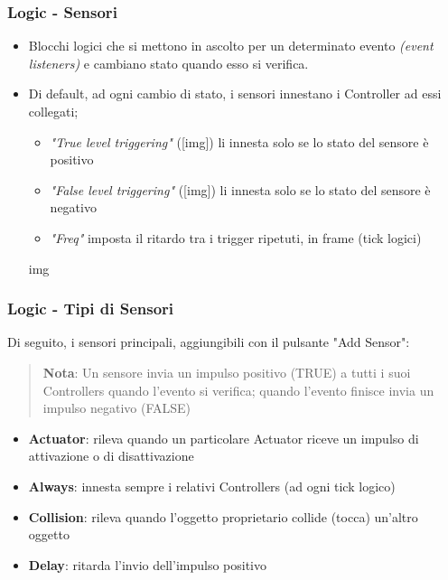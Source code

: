 \documentclass{beamer}
\begin{document}
		\begin{frame}		%
			\frametitle{Logic - Sensori}
			\begin{itemize}
				\item Blocchi logici che si mettono in ascolto per un determinato evento \textit{(event listeners)} e cambiano stato quando esso si verifica.
				\item Di default, ad ogni cambio di stato, i sensori innestano i Controller ad essi collegati;
				\begin{itemize}
					\item \textit{"True level triggering"} ([img]) li innesta solo se lo stato del sensore è positivo
					\item \textit{"False level triggering"} ([img]) li innesta solo se lo stato del sensore è negativo
					\item \textit{"Freq"} imposta il ritardo tra i trigger ripetuti, in frame (tick logici)
				\end{itemize}
				\item [img]
			\end{itemize}
		\end{frame}		
		\begin{frame}
			\frametitle{Logic - Tipi di Sensori}
			Di seguito, i sensori principali, aggiungibili con il pulsante "Add Sensor":\\
			\begin{quote}
			\textbf{Nota}: Un sensore invia un impulso positivo (TRUE) a tutti i suoi Controllers quando l'evento si verifica; quando l'evento finisce invia un impulso negativo (FALSE)
			\end{quote}
						
			\begin{itemize}
				\item \textbf{Actuator}: rileva quando un particolare Actuator riceve un impulso di attivazione o di disattivazione
				\item \textbf{Always}: innesta sempre i relativi Controllers (ad ogni tick logico)
				\item \textbf{Collision}: rileva quando l'oggetto proprietario collide (tocca) un'altro oggetto
				\item \textbf{Delay}: ritarda l'invio dell'impulso positivo
			\end{itemize}
		\end{frame}	
\end{document}
